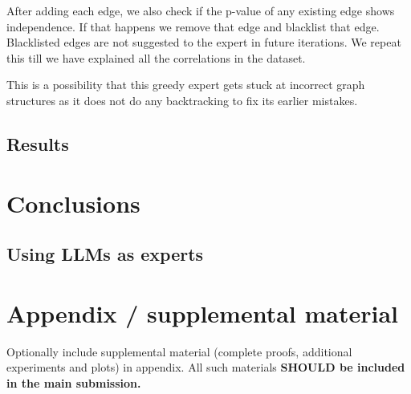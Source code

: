 \documentclass{article}
\begin{document}
After adding each edge, we also check if the p-value of any existing edge shows independence. If that happens we remove that edge and blacklist that edge. 
Blacklisted edges are not suggested to the expert in future iterations. We repeat this till we have explained all the correlations in the dataset.

This is a possibility that this greedy expert gets stuck at incorrect graph structures as it does not do any backtracking to fix its earlier mistakes.


\subsection{Results}

\section{Conclusions}
\subsection{Using LLMs as experts}







\appendix

\section{Appendix / supplemental material}


Optionally include supplemental material (complete proofs, additional experiments and plots) in appendix.
All such materials \textbf{SHOULD be included in the main submission.}



\end{document}
